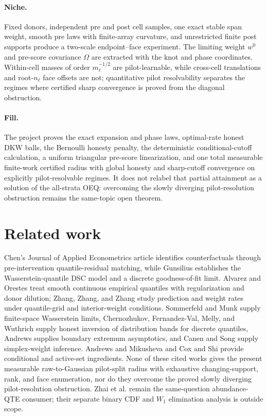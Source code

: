\documentclass{article}
\begin{document}
\paragraph{Niche.} Fixed donors, independent pre and post cell samples, one exact stable span weight, smooth pre laws with finite-array curvature, and unrestricted finite post supports produce a two-scale endpoint--face experiment.  The limiting weight \(w^0\) and pre-score covariance \(\Omega\) are extracted with the knot and phase coordinates.  Within-cell masses of order \(m_\ell^{-1/2}\) are pilot-learnable, while cross-cell translations and root-\(n_\ell\) face offsets are not; quantitative pilot resolvability separates the regimes where certified sharp convergence is proved from the diagonal obstruction.

\paragraph{Fill.} The project proves the exact expansion and phase laws, optimal-rate honest DKW balls, the Bernoulli honesty penalty, the deterministic conditional-cutoff calculation, a uniform triangular pre-score linearization, and one total measurable finite-work certified radius with global honesty and sharp-cutoff convergence on explicitly pilot-resolvable regimes.  It does not relabel that partial attainment as a solution of the all-strata OEQ: overcoming the slowly diverging pilot-resolution obstruction remains the same-topic open theorem.

\section{Related work}

Chen's Journal of Applied Econometrics article identifies counterfactuals through pre-intervention quantile-residual matching, while Gunsilius establishes the Wasserstein-quantile DSC model and a discrete goodness-of-fit limit.  Alvarez and Orestes treat smooth continuous empirical quantiles with regularization and donor dilution; Zhang, Zhang, and Zhang study prediction and weight rates under quantile-grid and interior-weight conditions.  Sommerfeld and Munk supply finite-space Wasserstein limits, Chernozhukov, Fernandez-Val, Melly, and Wuthrich supply honest inversion of distribution bands for discrete quantiles, Andrews supplies boundary extremum asymptotics, and Canen and Song supply simplex-weight inference.  Andrews and Mikusheva and Cox and Shi provide conditional and active-set ingredients.  None of these cited works gives the present measurable raw-to-Gaussian pilot-split radius with exhaustive changing-support, rank, and face enumeration, nor do they overcome the proved slowly diverging pilot-resolution obstruction.  Zhai et al. remain the same-question abundance-QTE consumer; their separate binary CDF and \(W_1\) elimination analysis is outside scope.
\end{document}

